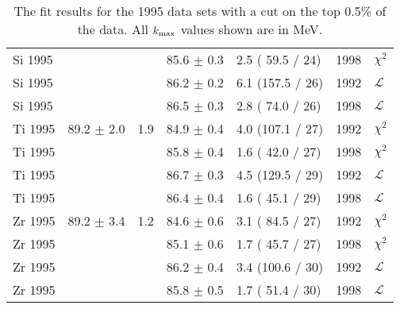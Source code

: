 \begin{table}[h]
\begin{center}
{\begin{tabular}{|l||l|l|l|l|l|l|}
        Si 1995 &                &     & 85.6 $\pm$ 0.3 & 2.5 ( 59.5 / 24) & 1998 & $\chi^2$ \\
        Si 1995 &                &     & 86.2 $\pm$ 0.2 & 6.1 (157.5 / 26) & 1992 & $\mathcal{L}$ \\
        Si 1995 &                &     & 86.5 $\pm$ 0.3 & 2.8 ( 74.0 / 26) & 1998 & $\mathcal{L}$ \\
        \hline
        Ti 1995 & 89.2 $\pm$ 2.0 & 1.9 & 84.9 $\pm$ 0.4 & 4.0 (107.1 / 27) & 1992 & $\chi^2$ \\
        Ti 1995 &                &     & 85.8 $\pm$ 0.4 & 1.6 ( 42.0 / 27) & 1998 & $\chi^2$ \\
        Ti 1995 &                &     & 86.7 $\pm$ 0.3 & 4.5 (129.5 / 29) & 1992 & $\mathcal{L}$ \\
        Ti 1995 &                &     & 86.4 $\pm$ 0.4 & 1.6 ( 45.1 / 29) & 1998 & $\mathcal{L}$ \\
        \hline
        Zr 1995 & 89.2 $\pm$ 3.4 & 1.2 & 84.6 $\pm$ 0.6 & 3.1 ( 84.5 / 27) & 1992 & $\chi^2$ \\
        Zr 1995 &                &     & 85.1 $\pm$ 0.6 & 1.7 ( 45.7 / 27) & 1998 & $\chi^2$ \\
        Zr 1995 &                &     & 86.2 $\pm$ 0.4 & 3.4 (100.6 / 30) & 1992 & $\mathcal{L}$ \\
        Zr 1995 &                &     & 85.8 $\pm$ 0.5 & 1.7 ( 51.4 / 30) & 1998 & $\mathcal{L}$ \\
        \hline
        
      \end{tabular}
    }
  \end{center}
  \caption{The fit results for the 1995 data sets with a cut on the top 0.5\% of the data. All $\mbox{$k_{\rm max}$}$ values shown are in MeV.}
  \label{table:fits1995}
\end{table}


